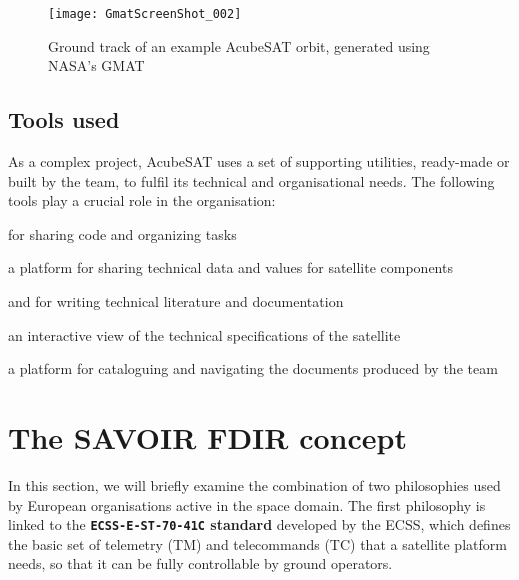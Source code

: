 \documentclass[a4paper,nobib]{tufte-book}
\begin{document}
\begin{figure}
	\texttt{[image: GmatScreenShot\_002]}
	\caption[Ground track of an example AcubeSAT orbit, generated using NASA's GMAT]{Ground track of an example AcubeSAT orbit, generated using NASA's \acl{GMAT} \autocite{nasa_general_mission}}
	\label{fig:gmat}
\end{figure}


\section{Tools used}

As a complex project, AcubeSAT uses a set of supporting utilities, ready-made or built by the team, to fulfil its technical and organisational needs. The following tools play a crucial role in the organisation:
\begin{compactitem}
	\item {} for sharing code and organizing tasks
	\item {} a platform for sharing technical data and values for satellite components
	\item {} and  for writing technical literature and documentation
	\item {} an interactive view of the technical specifications of the satellite
	\item {} a platform for cataloguing and navigating the documents produced by the team
\end{compactitem}

\chapter{The SAVOIR \acs{FDIR} concept}
\label{cap:savoir}

In this section, we will briefly examine the combination of two philosophies used by European organisations active in the space domain. The first philosophy is linked to the \textbf{\texttt{ECSS-E-ST-70-41C} standard} \autocite{ECSS-E-ST-70-41C} developed by the \acf{ECSS}, which defines the basic set of telemetry (\acs{TM}) and telecommands (\acs{TC}) that a satellite platform needs, so that it can be fully controllable by ground operators.
\end{document}
